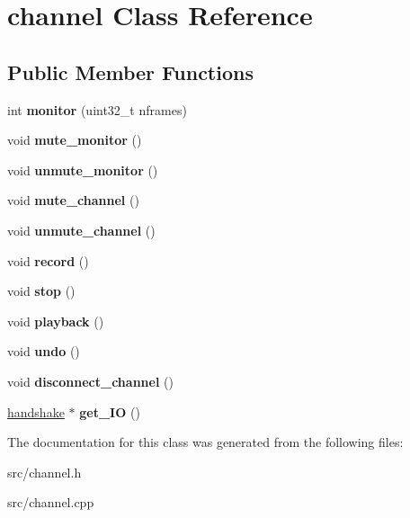 \hypertarget{classchannel}{}\section{channel Class Reference}
\label{classchannel}
\subsection*{Public Member Functions}
\begin{DoxyCompactItemize}
\item 
\mbox{\label{classchannel_a130a2f64e5d4d2bbebf5cca1f572cd98}} 
int {\bfseries monitor} (uint32\+\_\+t nframes)
\item 
\mbox{\label{classchannel_ad290679ac4562b61e29dad7e2ee6afe5}} 
void {\bfseries mute\+\_\+monitor} ()
\item 
\mbox{\label{classchannel_a80fe57d86e13a757b4da322fb58f10e8}} 
void {\bfseries unmute\+\_\+monitor} ()
\item 
\mbox{\label{classchannel_a89108f9e9c8722c694794812441976dd}} 
void {\bfseries mute\+\_\+channel} ()
\item 
\mbox{\label{classchannel_af6a2f423b995869b2ec0a2265f32f907}} 
void {\bfseries unmute\+\_\+channel} ()
\item 
\mbox{\label{classchannel_aa87ebcc47bdf707ef59653b6c78f65b9}} 
void {\bfseries record} ()
\item 
\mbox{\label{classchannel_a3ac3a6cf05b4e8a5b5884a10b8a6c0a4}} 
void {\bfseries stop} ()
\item 
\mbox{\label{classchannel_afd7ccbda42c0ede6c84098a97783b9a2}} 
void {\bfseries playback} ()
\item 
\mbox{\label{classchannel_ad7efc911726f155af8df17004d7962fc}} 
void {\bfseries undo} ()
\item 
\mbox{\label{classchannel_acdd44b1676fb73669d06ce94079f04eb}} 
void {\bfseries disconnect\+\_\+channel} ()
\item 
\mbox{\label{classchannel_a04ea6b0dd5037b24ea8f7fe983fd6ad9}} 
\mbox{\hyperlink{classhandshake}{handshake}} $\ast$ {\bfseries get\+\_\+\+IO} ()
\end{DoxyCompactItemize}


The documentation for this class was generated from the following files\+:\begin{DoxyCompactItemize}
\item 
src/channel.\+h\item 
src/channel.\+cpp\end{DoxyCompactItemize}
